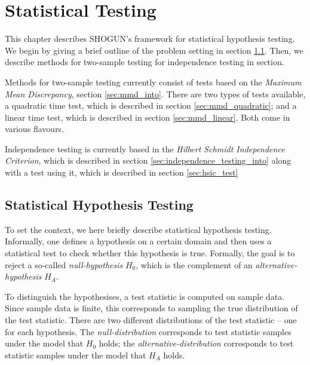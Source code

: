 %

\chapter{Statistical Testing}
This chapter describes SHOGUN's framework for statistical hypothesis testing. We begin by giving a brief outline of the problem setting in section \ref{sec:hypothesis_testing_into}. Then, we describe methods for two-sample testing for independence testing in section.

Methods for two-sample testing currently consist of tests based on the \emph{Maximum Mean Discrepancy}, section \ref{sec:mmd_into}. There are two types of tests available, a quadratic time test, which is described in section \ref{sec:mmd_quadratic}; and a linear time test, which is described in section \ref{sec:mmd_linear}. Both come in various flavours.

Independence testing is currently based in the \emph{Hilbert Schmidt Independence Criterion}, which is described in section \ref{sec:independence_testing_into} along with a test using it, which is described in section \ref{sec:hsic_test}

\section{Statistical Hypothesis Testing}
\label{sec:hypothesis_testing_into}

To set the context, we here briefly describe statistical hypothesis testing. Informally, one defines a hypothesis on a certain domain and then uses a statistical test to check whether this hypothesis is true. Formally, the goal is to reject a so-called \emph{null-hypothesis} $H_0$, which is the complement of an \emph{alternative-hypothesis} $H_A$. 

To distinguish the hypothesises, a test statistic is computed on sample data. Since sample data is finite, this corresponds to sampling the true distribution of the test statistic. There are two different distributions of the test statistic -- one for each hypothesis. The \emph{null-distribution} corresponds to test statistic samples under the model that $H_0$ holds; the \emph{alternative-distribution} corresponds to test statistic samples under the model that $H_A$ holds.

